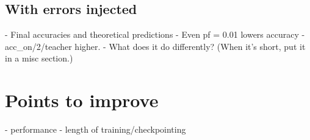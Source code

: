 \documentclass{farlamp}
\begin{document}
\subsection{With errors injected}

- Final accuracies and theoretical predictions
- Even pf = 0.01 lowers accuracy
- acc_on/2/teacher higher.
- What does it do differently?
(When it's short, put it in a misc section.)


\section{Points to improve}

- performance
- length of training/checkpointing
\end{document}
